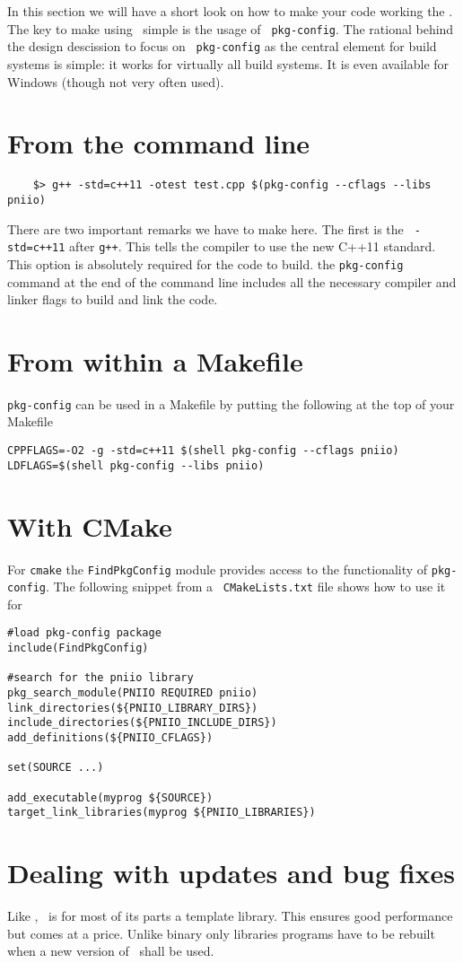 
In this section we will have a short look on how to make your code working the
\libpniio. The key to make using \libpniio\ simple is the usage of {\tt
pkg-config}. The rational behind the design descission to focus on {\tt
pkg-config} as the central element for build systems is simple: it works for
virtually all build systems. It is even available for Windows (though not very
often used). 

\section{From the command line}

\begin{verbatim}
    $> g++ -std=c++11 -otest test.cpp $(pkg-config --cflags --libs pniio)
\end{verbatim}
There are two important remarks we have to make here. The first is the {\tt
-std=c++11} after {\tt g++}. This tells the compiler to use the new C++11
standard. This option is absolutely required for the code to build. 
the {\tt pkg-config} command at the end of the command line includes all the
necessary compiler and linker flags to build and link the code.

\section{From within a Makefile}

{\tt pkg-config} can be used in a Makefile by putting the following at the top
of your Makefile
\begin{verbatim}
CPPFLAGS=-O2 -g -std=c++11 $(shell pkg-config --cflags pniio)
LDFLAGS=$(shell pkg-config --libs pniio)
\end{verbatim}

\section{With CMake}

For {\tt cmake} the {\tt FindPkgConfig} module provides access to the
functionality of {\tt pkg-config}. The following snippet from a {\tt
CMakeLists.txt} file shows how to use it for \libpniio
\begin{verbatim}
#load pkg-config package
include(FindPkgConfig)

#search for the pniio library 
pkg_search_module(PNIIO REQUIRED pniio)
link_directories(${PNIIO_LIBRARY_DIRS})
include_directories(${PNIIO_INCLUDE_DIRS})
add_definitions(${PNIIO_CFLAGS})

set(SOURCE ...)

add_executable(myprog ${SOURCE})
target_link_libraries(myprog ${PNIIO_LIBRARIES})
\end{verbatim}

\section{Dealing with updates and bug fixes}

Like \libpnicore, \libpniio\ is for most of its parts a template library. This
ensures good performance but comes at a price. Unlike binary only libraries
programs have to be rebuilt when a new version of \libpniio\ shall be used. 

